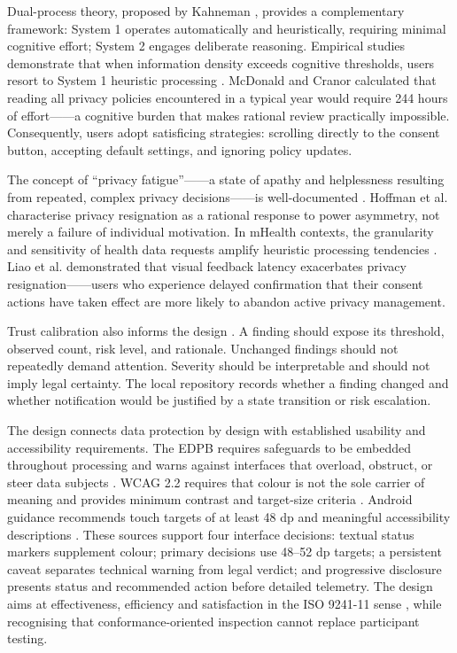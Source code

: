 Dual-process theory, proposed by Kahneman \cite{22}, provides a complementary framework: System 1 operates automatically and heuristically, requiring minimal cognitive effort; System 2 engages deliberate reasoning. Empirical studies demonstrate that when information density exceeds cognitive thresholds, users resort to System 1 heuristic processing \cite{12,13}. McDonald and Cranor \cite{12} calculated that reading all privacy policies encountered in a typical year would require 244 hours of effort——a cognitive burden that makes rational review practically impossible. Consequently, users adopt satisficing strategies: scrolling directly to the consent button, accepting default settings, and ignoring policy updates.

The concept of ``privacy fatigue''——a state of apathy and helplessness resulting from repeated, complex privacy decisions——is well-documented \cite{10}. Hoffman et al. \cite{10} characterise privacy resignation as a rational response to power asymmetry, not merely a failure of individual motivation. In mHealth contexts, the granularity and sensitivity of health data requests amplify heuristic processing tendencies \cite{14}. Liao et al. \cite{14} demonstrated that visual feedback latency exacerbates privacy resignation——users who experience delayed confirmation that their consent actions have taken effect are more likely to abandon active privacy management.

Trust calibration also informs the design \cite{34}. A finding should expose its threshold, observed count, risk level, and rationale. Unchanged findings should not repeatedly demand attention. Severity should be interpretable and should not imply legal certainty. The local repository records whether a finding changed and whether notification would be justified by a state transition or risk escalation.

The design connects data protection by design with established usability and accessibility requirements. The EDPB requires safeguards to be embedded throughout processing and warns against interfaces that overload, obstruct, or steer data subjects \cite{edpb2019,edpb2022}. WCAG 2.2 requires that colour is not the sole carrier of meaning and provides minimum contrast and target-size criteria \cite{wcag22}. Android guidance recommends touch targets of at least 48 dp and meaningful accessibility descriptions \cite{androidaccess}. These sources support four interface decisions: textual status markers supplement colour; primary decisions use 48--52 dp targets; a persistent caveat separates technical warning from legal verdict; and progressive disclosure presents status and recommended action before detailed telemetry. The design aims at effectiveness, efficiency and satisfaction in the ISO 9241-11 sense \cite{iso924111}, while recognising that conformance-oriented inspection cannot replace participant testing.

